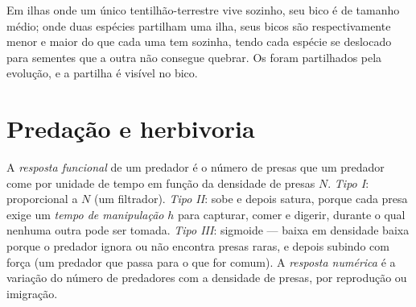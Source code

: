 \begin{example}\label{ex:b1:species-interactions:finches}
Em ilhas onde um único tentilhão-terrestre vive sozinho, seu bico é de
tamanho médio; onde duas espécies partilham uma ilha, seus bicos são
respectivamente menor e maior do que cada uma tem sozinha, tendo cada
espécie se deslocado para sementes que a outra não consegue quebrar.
Os  foram partilhados pela evolução, e a partilha é visível no
bico.
\end{example}

\section{Predação e herbivoria}

\begin{definition}\label{def:b1:species-interactions:functional}
A \emph{resposta funcional} de um predador é o número de presas que um
predador come por unidade de tempo em função da densidade de presas
$N$. \emph{Tipo I}: proporcional a $N$ (um filtrador). \emph{Tipo II}:
sobe e depois satura, porque cada presa exige um \emph{tempo de
manipulação} $h$ para capturar, comer e digerir, durante o qual
nenhuma outra pode ser tomada. \emph{Tipo III}: sigmoide --- baixa em
densidade baixa porque o predador ignora ou não encontra presas raras,
e depois subindo com força (um predador que passa para o que for
comum). A \emph{resposta numérica} é a variação do número de
predadores com a densidade de presas, por reprodução ou imigração.
\end{definition}

